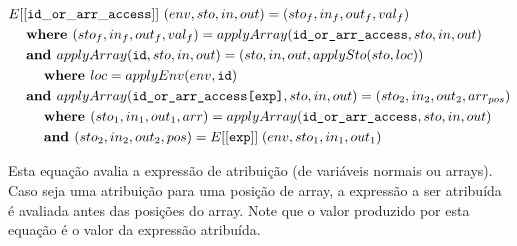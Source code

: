 \documentclass[12pt]{article}
\newcommand\eb[1]{[[\texttt{#1}]]}
\begin{document}
\begin{align*}
&E[[{\tt id\_or\_arr\_access}]]\ (env,sto,in,out) = (sto_f,in_f,out_f,val_f) \\
&\hspace{3ex}\textbf{where } (sto_f,in_f,out_f,val_f) = applyArray(\texttt{id\_or\_arr\_access},sto,in,out) \\
&\hspace{3ex}\textbf{and } applyArray(\texttt{id},sto,in,out) = (sto,in,out,applySto(sto,loc)) \\
&\hspace{6ex}\textbf{where } loc = applyEnv(env,\texttt{id}) \\
&\hspace{3ex}\textbf{and } applyArray(\texttt{id\_or\_arr\_access[exp]}, sto,in,out) = (sto_2,in_2,out_2,arr_{pos}) \\
&\hspace{6ex}\textbf{where } (sto_1,in_1,out_1,arr) = applyArray(\texttt{id\_or\_arr\_access},sto,in,out) \\
&\hspace{6ex}\textbf{and } (sto_2,in_2,out_2,pos) = E\eb{exp} \;(env,sto_1,in_1,out_1) \\
\end{align*}

Esta equação avalia a expressão de atribuição (de variáveis normais ou arrays). Caso seja uma atribuição para uma posição de array, a expressão a ser atribuída é avaliada antes das posições do array. Note que o valor produzido por esta equação é o valor da expressão atribuída.
\end{document}
